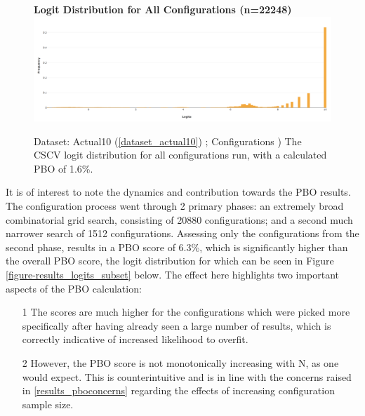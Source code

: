 \documentclass[a4paper,11pt,oneside]{article}
\theoremstyle{plain}
\theoremstyle{definition}
\begin{document}
	
	\begin{figure}[H]
		\centering 
		\textbf{Logit Distribution for All Configurations (n=22248)}
		\includegraphics[scale=0.25]{images/results/pbo/all_sets_dist.png} 
		\caption[Logit Distribution for All Configurations]{Dataset: Actual10 (\ref{dataset_actual10}) ; Configurations )
			\newline The CSCV logit distribution for all configurations run, with a calculated PBO of 1.6\%.}
		\label{figure-results_logits_all}
	\end{figure}
	
	
	It is of interest to note the dynamics and contribution towards the PBO results. The configuration process went through 2 primary phases: an extremely broad combinatorial grid search, consisting of 20880 configurations; and a second much narrower search of 1512 configurations. Assessing only the configurations from the second phase, results in a PBO score of 6.3\%, which is significantly higher than the overall PBO score, the logit distribution for which can be seen in Figure \ref{figure-results_logits_subset} below. The effect here highlights two important aspects of the PBO calculation:
	\begin{itemize}
		\item[1] The scores are much higher for the configurations which were picked more specifically after having already seen a large number of results, which is correctly indicative of increased likelihood to overfit.
		\item[2] However, the PBO score is not monotonically increasing with N, as one would expect. This is counterintuitive and is in line with the concerns raised in \ref{results_pboconcerns} regarding the effects of increasing configuration sample size.
	\end{itemize}
	
\end{document}
